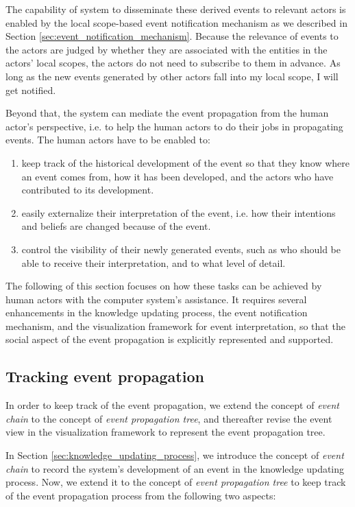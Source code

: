 The capability of system to disseminate these derived events to relevant actors is enabled by the local scope-based event notification mechanism as we described in Section \ref{sec:event_notification_mechanism}. Because the relevance of events to the actors are judged by whether they are associated with the entities in the actors' local scopes, the actors do not need to subscribe to them in advance. As long as the new events generated by other actors fall into my local scope, I will get notified.  

Beyond that, the system can mediate the event propagation from the human actor's perspective, i.e. to help the human actors to do their jobs in propagating events. The human actors have to be enabled to:

\begin{enumerate}
	\item keep track of the historical development of the event so that they know where an event comes from, how it has been developed, and the actors who have contributed to its development.
	\item easily externalize their interpretation of the event, i.e. how their intentions and beliefs are changed because of the event.
	\item control the visibility of their newly generated events, such as who should be able to receive their interpretation, and to what level of detail.
\end{enumerate}

The following of this section focuses on how these tasks can be achieved by human actors with the computer system's assistance. It requires several enhancements in the knowledge updating process, the event notification mechanism, and the visualization framework for event interpretation, so that the social aspect of the event propagation is explicitly represented and supported.

\subsection{Tracking event propagation} %
\label{sub:tracking_event_propagation}
In order to keep track of the event propagation, we extend the concept of \emph{event chain} to the concept of \emph{event propagation tree}, and thereafter revise the event view in the visualization framework to represent the event propagation tree. 

In Section \ref{sec:knowledge_updating_process}, we introduce the concept of \emph{event chain} to record the system's development of an event in the knowledge updating process. Now, we extend it to the concept of \emph{event propagation tree} to keep track of the event propagation process from the following two aspects:

